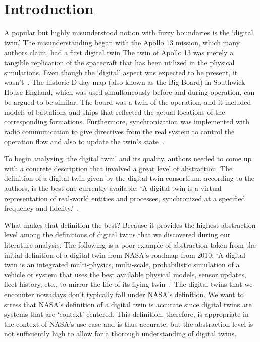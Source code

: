 \documentclass[9pt,conference]{IEEEtran}
\begin{document}
    \section{Introduction}\label{section:introduction}
    A popular but highly misunderstood notion with fuzzy boundaries is the `digital twin.' 
    The misunderstanding began with the Apollo 13 mission, which many authors claim, had a first digital twin The twin of Apollo 13 was merely a tangible replication of the spacecraft that has been utilized in the physical simulations. Even though the `digital' aspect was expected to be present, 
    it wasn't~\cite{GrievesApollo13}. The historic D-day map (also known as the Big Board) in Southwick House England, which was used simultaneously before and during operation, can be argued to be similar. 
    The board was a twin of the operation, and it included models of battalions and ships that reflected the actual locations of the corresponding formations. 
    Furthermore, synchronization was implemented with radio communication to give directives from the real system to control the operation flow and also to update the twin's state~\cite{AMRC}.

    To begin analyzing `the digital twin' and its quality, authors needed to come up with a concrete description that involved a great level of abstraction. 
    The definition of a digital twin given by the digital twin consortium, according to the authors, is the best one currently available: `A digital twin is a virtual representation of real-world entities and processes, synchronized at 
    a specified frequency and fidelity.'~\cite{digitaltwinconsortium2022}.

    What makes that definition the best? Because it provides the highest abstraction level among the definitions of digital twins that we discovered during our literature analysis. The following is a poor example of abstraction taken from the initial definition of a digital twin from NASA's roadmap from 2010: `A digital twin is an integrated multi-physics, multi-scale, probabilistic simulation of a 
    vehicle or system that uses the best available physical models, sensor updates, fleet history, etc., to mirror the life of its flying twin~\cite{NASA}.'
    The digital twins that we encounter nowadays don't typically fall under NASA's definition. We want to stress that NASA's definition of a  digital twin is accurate since digital twins are systems that are `context' centered. 
    This definition, therefore, is appropriate in the context of NASA's use case and is thus accurate, but the abstraction level is not sufficiently high to allow for a thorough understanding of digital twins.
\end{document}
